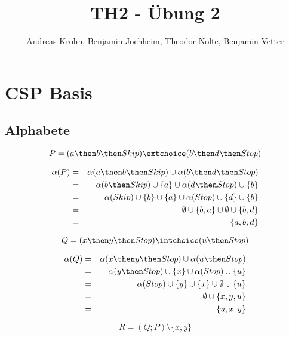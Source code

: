 \documentclass{scrreprt}
\begin{document}
\author{Andreas Krohn, Benjamin Jochheim, Theodor Nolte, Benjamin Vetter}
\title{TH2 - Übung 2}

\maketitle

\chapter{CSP Basis}

\section{Alphabete}

\begin{equation}
  P = (a \then b \then Skip) \extchoice (b \then d \then Stop)
\end{equation}

\begin{eqnarray*}
  \alpha(P) &=& \alpha(a \then b \then Skip) \cup \alpha(b \then d \then Stop) \\
            &=& \alpha(b \then Skip) \cup \{a\} \cup \alpha(d \then Stop) \cup \{b\} \\
            &=& \alpha(Skip) \cup \{b\} \cup \{a\} \cup \alpha(Stop) \cup \{d\} \cup \{b\} \\
            &=& \emptyset \cup \{b, a\} \cup \emptyset \cup \{b, d\} \\
            &=& \{a, b, d\}
\end{eqnarray*}

\begin{equation}
  Q = (x \then y \then Stop) \intchoice (u \then Stop)
\end{equation}

\begin{eqnarray*}
  \alpha(Q) &=& \alpha(x \then y \then Stop) \cup \alpha(u \then Stop) \\
            &=& \alpha(y \then Stop) \cup \{x\} \cup \alpha(Stop) \cup \{u\} \\
            &=& \alpha(Stop) \cup \{y\} \cup \{x\} \cup \emptyset \cup \{u\} \\
            &=& \emptyset \cup \{x, y, u\} \\
            &=& \{u, x, y\}
\end{eqnarray*}

\begin{equation}
  R = (Q; P) \setminus \{x, y\}
\end{equation}
\end{document}
